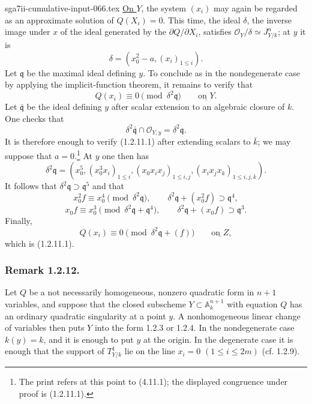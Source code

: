 \begin{filecontents*}{sga7ii-cumulative-input-066.tex}
\underline{On $Y$}, the system $(x_i)$ may again be regarded as an
approximate solution of $Q(X_i)=0$.  This time, the ideal $\delta$,
the inverse image under $x$ of the ideal generated by the
$\partial Q/\partial X_i$, satisfies
$\mathcal O_Y/\delta\simeq J^n_{Y/k}$; at $y$ it is
\[
\delta=(x_0^2-a,(x_i)_{1\leq i}).
\]
Let $\mathfrak q$ be the maximal ideal defining $y$.  To conclude as
in the nondegenerate case by applying the implicit-function theorem,
it remains to verify that
\begin{equation}\tag{1.2.11.1}
Q(x_i)\equiv0\pmod{\delta^2\mathfrak q}
\qquad\underline{\text{on }Y}.
\end{equation}
Let $\bar{\mathfrak q}$ be the ideal defining $y$ after scalar
extension to an algebraic closure of $k$.  One checks that
\[
\delta^2\bar{\mathfrak q}\cap\mathcal O_{Y,y}
=\delta^2\mathfrak q.
\]
It is therefore enough to verify (1.2.11.1) after extending scalars
to $\bar k$; we may suppose that $a=0$.\footnote{The print refers at
this point to (4.11.1); the displayed congruence under proof is
(1.2.11.1).}
At $y$ one then has
\[
\delta^2\mathfrak q=
(x_0^5,(x_0^3x_i)_{1\leq i},
 (x_0x_ix_j)_{1\leq i,j},
 (x_ix_jx_k)_{1\leq i,j,k}).
\]
It follows that $\delta^2\mathfrak q\supset\mathfrak q^5$ and that
\[
x_0^2f\equiv x_0^4\pmod{\delta^2\mathfrak q},
\qquad
\delta^2\mathfrak q+(x_0^2f)\supset\mathfrak q^4,
\]
\[
x_0f\equiv x_0^3
 \pmod{\delta^2\mathfrak q+\mathfrak q^4},
\qquad
\delta^2\mathfrak q+(x_0f)\supset\mathfrak q^3.
\]
Finally,
\[
Q(x_i)\equiv0\pmod{\delta^2\mathfrak q+(f)}
\qquad\underline{\text{on }Z},
\]
which is (1.2.11.1).

\subsubsection*{Remark 1.2.12.}
Let $Q$ be a not necessarily homogeneous, nonzero quadratic form in
$n+1$ variables, and suppose that the closed subscheme
$Y\subset\mathbb A_k^{n+1}$ with equation $Q$ has an ordinary
quadratic singularity at a point $y$.  A nonhomogeneous linear change
of variables then puts $Y$ into the form 1.2.3 or 1.2.4.  In the
nondegenerate case $k(y)=k$, and it is enough to put $y$ at the
origin.  In the degenerate case it is enough that the support of
$T^1_{Y/k}$ lie on the line $x_i=0$ $(1\leq i\leq2m)$
(cf. 1.2.9).
\end{filecontents*}
